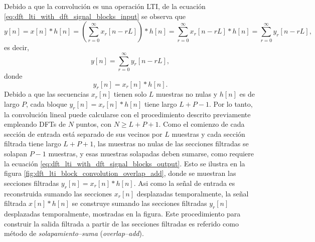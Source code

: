 \documentclass[a4paper]{report}
\begin{document}
Debido a que la convolución es una operación LTI, de la ecuación \ref{eq:dft_lti_with_dft_signal_blocks_input} se observa que 
\[
 y[n]=x[n]*h[n]=\left(\sum_{r=0}^\infty x_r[n-rL]\right)*h[n]=\sum_{r=0}^\infty x_r[n-rL]*h[n]=\sum_{r=0}^\infty y_r[n-rL],
\]
es decir,
\begin{equation}\label{eq:dft_lti_with_dft_signal_blocks_output}
 y[n]=\sum_{r=0}^\infty y_r[n-rL],
\end{equation}
donde
\[
 y_r[n]=x_r[n]*h[n].
\]
Debido a que las secuencias \(x_r[n]\) tienen solo \(L\) muestras no nulas y \(h[n]\) es de largo \(P\), cada bloque \(y_r[n]=x_r[n]*h[n]\) tiene largo \(L+P-1\). Por lo tanto, la convolución lineal puede calcularse con el procedimiento descrito previamente empleando DFTs de \(N\) puntos, con \(N\geq L+P+1\). Como el comienzo de cada sección de entrada está separado de sus vecinos por \(L\) muestras y cada sección filtrada tiene largo \(L+P+1\), las muestras no nulas de las secciones filtradas se solapan \(P-1\) muestras, y esas muestras solapadas deben sumarse, como requiere la ecuación \ref{eq:dft_lti_with_dft_signal_blocks_output}. Esto se ilustra en la figura \ref{fig:dft_lti_block_convolution_overlap_add}, donde se muestran las secciones filtradas \(y_r[n]=x_r[n]*h[n]\). Asi como la señal de entrada es reconstruida sumando las secciones \(x_r[n]\) desplazadas temporalmente, la señal filtrada \(x[n]*h[n]\) se construye sumando las secciones filtradas \(y_r[n]\) desplazadas temporalmente, mostradas en la figura. Este procedimiento para construir la salida filtrada a partir de las secciones filtradas es referido como método de \emph{solapamiento--suma} (\emph{overlap--add}).
\end{document}
